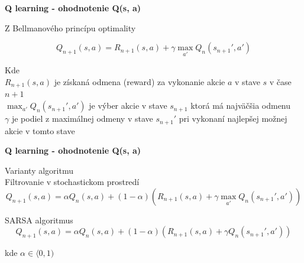 \documentclass[xcolor=dvipsnames]{beamer}
\begin{document}
\begin{frame}{\bf Q learning - ohodnotenie Q(s, a)}

Z Bellmanového princípu optimality

\begin{equation}
\label{q_learning}
   Q_{n+1}(s, a) = R_{n+1}(s, a) + \gamma \max_{a'} Q_n(s_{n+1}', a')
\end{equation}

Kde \\
$R_{n+1}(s, a)$ je získaná odmena (reward) za vykonanie akcie $a$ v stave $s$ v čase
$n+1$ \\
\bigskip
$\max_{a'} Q_n(s_{n+1}', a')$ je výber akcie v stave $s_{n+1}$ ktorá má najväčšia odmenu \\
\bigskip
$\gamma$ je podiel z maximálnej odmeny v stave $s_{n+1}'$ pri vykonaní najlepšej
možnej akcie v tomto stave \\

\end{frame}


\begin{frame}{\bf Q learning - ohodnotenie Q(s, a)}

Varianty algoritmu \\

Filtrovanie v stochastickom prostredí
\begin{equation}
\label{q_learning}
   Q_{n+1}(s, a) = \alpha Q_{n}(s, a) + (1-\alpha) ( R_{n+1}(s, a) + \gamma \max_{a'} Q_n(s_{n+1}', a') ) \nonumber
\end{equation}

SARSA algoritmus
\begin{equation}
\label{q_learning}
   Q_{n+1}(s, a) = \alpha Q_{n}(s, a) + (1-\alpha) ( R_{n+1}(s, a) + \gamma Q_n(s_{n+1}', a') ) \nonumber
\end{equation}

\bigskip
kde $\alpha \in \langle 0, 1) $ \\

\end{frame}
\end{document}
